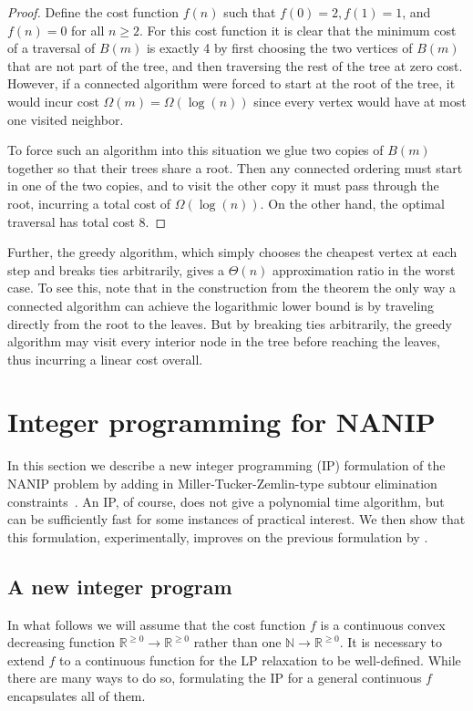 \documentclass[english]{llncs}
\begin{document}
\begin{proof}
Define the cost function $f(n)$ such that $f(0) = 2, f(1) = 1$, and $f(n) = 0$
for all $n \geq 2$. For this cost function it is clear that the minimum cost of
a traversal of $B(m)$ is exactly 4 by first choosing the two vertices of $B(m)$
that are not part of the tree, and then traversing the rest of the tree at zero
cost. However, if a connected algorithm were forced to start at the root of the
tree, it would incur cost $\Omega(m) = \Omega(\log(n))$ since every vertex
would have at most one visited neighbor. 

To force such an algorithm into this situation we glue two copies of $B(m)$
together so that their trees share a root. Then any connected ordering must
start in one of the two copies, and to visit the other copy it must pass
through the root, incurring a total cost of $\Omega(\log(n))$. On the other
hand, the optimal traversal has total cost 8. 

\end{proof}

Further, the greedy algorithm, which simply chooses the cheapest vertex at each
step and breaks ties arbitrarily, gives a $\Theta(n)$ approximation ratio in
the worst case. To see this, note that in the construction from the theorem the
only way a connected algorithm can achieve the logarithmic lower bound is by
traveling directly from the root to the leaves. But by breaking ties
arbitrarily, the greedy algorithm may visit every interior node in the tree
before reaching the leaves, thus incurring a linear cost overall.


\section{Integer programming for NANIP}\label{section:IP}

In this section we describe a new integer programming (IP) formulation of the
NANIP problem by adding in Miller-Tucker-Zemlin-type subtour elimination
constraints~\cite{miller1960integer}.  An IP, of course, does not give a
polynomial time algorithm, but can be sufficiently fast for some instances of
practical interest.  We then show that this formulation, experimentally,
improves on the previous formulation by \cite{Gutfraind14}.

\subsection{A new integer program}

In what follows we will assume that the cost function $f$ is a continuous
convex decreasing function $\mathbb{R}^{\geq 0} \to \mathbb{R}^{\geq 0}$ rather
than one $\mathbb{N} \to \mathbb{R}^{\geq 0}$. It is necessary to extend $f$ to
a continuous function for the LP relaxation to be well-defined.  While there
are many ways to do so, formulating the IP for a general continuous $f$
encapsulates all of them.
\end{document}
